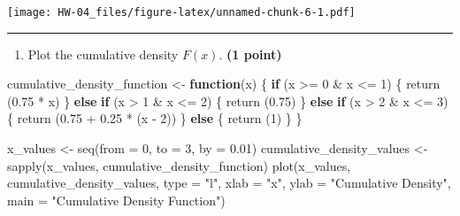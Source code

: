 \documentclass[
]{article}
\newenvironment{Shaded}{\begin{snugshade}}{\end{snugshade}}
\newcommand{\AttributeTok}[1]{\textcolor[rgb]{0.77,0.63,0.00}{#1}}
\newcommand{\ControlFlowTok}[1]{\textcolor[rgb]{0.13,0.29,0.53}{\textbf{#1}}}
\newcommand{\DecValTok}[1]{\textcolor[rgb]{0.00,0.00,0.81}{#1}}
\newcommand{\FloatTok}[1]{\textcolor[rgb]{0.00,0.00,0.81}{#1}}
\newcommand{\FunctionTok}[1]{\textcolor[rgb]{0.00,0.00,0.00}{#1}}
\newcommand{\NormalTok}[1]{#1}
\newcommand{\OtherTok}[1]{\textcolor[rgb]{0.56,0.35,0.01}{#1}}
\newcommand{\SpecialCharTok}[1]{\textcolor[rgb]{0.00,0.00,0.00}{#1}}
\newcommand{\StringTok}[1]{\textcolor[rgb]{0.31,0.60,0.02}{#1}}
\providecommand{\tightlist}{%
  \setlength{\itemsep}{0pt}\setlength{\parskip}{0pt}}
\begin{document}
\texttt{[image: HW-04\_files/figure-latex/unnamed-chunk-6-1.pdf]}

\begin{center}\rule{0.5\linewidth}{0.5pt}\end{center}

\begin{enumerate}
\def\labelenumi{\arabic{enumi}.}
\setcounter{enumi}{6}
\tightlist
\item
  Plot the cumulative density \(F(x)\). \textbf{(1 point)}
\end{enumerate}

\begin{Shaded}
\begin{Highlighting}[]

\NormalTok{cumulative\_density\_function }\OtherTok{\textless{}{-}} \ControlFlowTok{function}\NormalTok{(x) \{}
  \ControlFlowTok{if}\NormalTok{ (x }\SpecialCharTok{\textgreater{}=} \DecValTok{0} \SpecialCharTok{\&}\NormalTok{ x }\SpecialCharTok{\textless{}=} \DecValTok{1}\NormalTok{) \{}
    \FunctionTok{return}\NormalTok{ (}\FloatTok{0.75} \SpecialCharTok{*}\NormalTok{ x)}
\NormalTok{  \} }\ControlFlowTok{else} \ControlFlowTok{if}\NormalTok{ (x }\SpecialCharTok{\textgreater{}} \DecValTok{1} \SpecialCharTok{\&}\NormalTok{ x }\SpecialCharTok{\textless{}=} \DecValTok{2}\NormalTok{) \{}
    \FunctionTok{return}\NormalTok{ (}\FloatTok{0.75}\NormalTok{)}
\NormalTok{  \} }\ControlFlowTok{else} \ControlFlowTok{if}\NormalTok{ (x }\SpecialCharTok{\textgreater{}} \DecValTok{2} \SpecialCharTok{\&}\NormalTok{ x }\SpecialCharTok{\textless{}=} \DecValTok{3}\NormalTok{) \{}
    \FunctionTok{return}\NormalTok{ (}\FloatTok{0.75} \SpecialCharTok{+} \FloatTok{0.25} \SpecialCharTok{*}\NormalTok{ (x }\SpecialCharTok{{-}} \DecValTok{2}\NormalTok{))}
\NormalTok{  \} }\ControlFlowTok{else}\NormalTok{ \{}
    \FunctionTok{return}\NormalTok{ (}\DecValTok{1}\NormalTok{)}
\NormalTok{  \}}
\NormalTok{\}}

\NormalTok{x\_values }\OtherTok{\textless{}{-}} \FunctionTok{seq}\NormalTok{(}\AttributeTok{from =} \DecValTok{0}\NormalTok{, }\AttributeTok{to =} \DecValTok{3}\NormalTok{, }\AttributeTok{by =} \FloatTok{0.01}\NormalTok{)}
\NormalTok{cumulative\_density\_values }\OtherTok{\textless{}{-}} \FunctionTok{sapply}\NormalTok{(x\_values, cumulative\_density\_function)}
\FunctionTok{plot}\NormalTok{(x\_values, cumulative\_density\_values, }\AttributeTok{type =} \StringTok{"l"}\NormalTok{, }\AttributeTok{xlab =} \StringTok{"x"}\NormalTok{, }\AttributeTok{ylab =} \StringTok{"Cumulative Density"}\NormalTok{, }\AttributeTok{main =} \StringTok{"Cumulative Density Function"}\NormalTok{)}
\end{Highlighting}
\end{Shaded}
\end{document}

